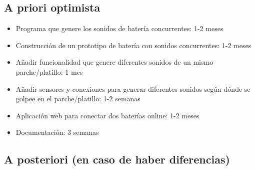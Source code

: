 
        \subsection{A priori optimista} %
        \label{sub:APrioriOptimista}

            \begin{itemize}
                \item
                    Programa que genere los sonidos de batería concurrentes: 1-2 meses
                \item
                    Construcción de un prototipo de batería con sonidos concurrentes: 1-2 meses
                \item
                    Añadir funcionalidad que genere diferentes sonidos de un mismo parche/platillo: 1 mes
                \item
                    Añadir sensores y conexiones para generar diferentes sonidos según dónde se golpee en el
                    parche/platillo: 1-2 semanas
                \item
                    Aplicación web para conectar dos baterías online: 1-2 meses
                \item
                    Documentación: 3 semanas
            \end{itemize}


        \subsection{A posteriori (en caso de haber diferencias)} %
        \label{sub:APosterioriEnCasoDeHaberDiferencias)}



